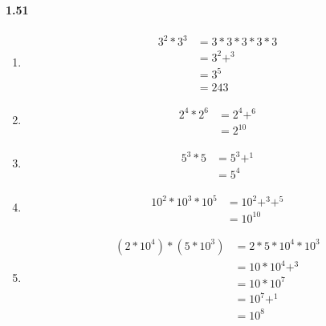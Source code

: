 \documentclass{article}
\newcommand\litem[1]{\item{\bfseries#1\space}}
\begin{document}
\paragraph{1.51}
\begin{enumerate}[label=\emph{\alph*})]
\litem{
\begin{align*}
  3^2 * 3^3 &= 3 * 3 * 3 * 3 * 3 \\
  &=3^2+^3 \\
  &= 3^5 \\
  &=  243
\end{align*}
}
\litem{
\begin{align*}
  2^4 * 2^6 &= 2^4+^6 \\
  &= 2^10
\end{align*}
}
\litem{
\begin{align*}
  5^3 * 5 &= 5^3+^1 \\
  &= 5^4
\end{align*}
}
\litem{
\begin{align*}
  10^2 * 10^3 * 10^5 &= 10^2+^3+^5 \\
  &= 10^10
\end{align*}
}
\litem{
\begin{align*}
  (2 * 10^4) * (5 * 10^3) &= 2 * 5 * 10^4 * 10^3 \\
  &= 10 * 10^4+^3 \\
  &= 10 * 10^7 \\
  &= 10^7+^1 \\
  &= 10^8
\end{align*}
}
\end{enumerate}
\end{document}
